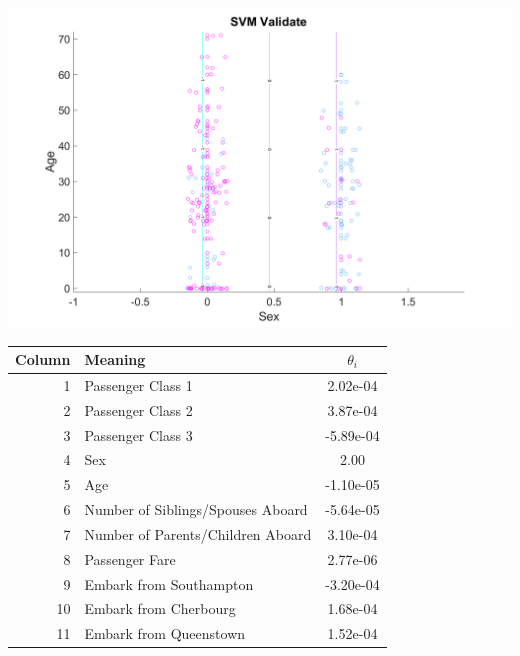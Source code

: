 \documentclass[10pt,letterpaper]{article}
\begin{document}
\begin{minipage}{\textwidth}
\begin{minipage}[b]{.4\textwidth}
\centering
\includegraphics[width=\linewidth]{figures/sex_age_validate.png}
\label{sexagelr}
\end{minipage}
\hfill
\begin{minipage}[b]{.59\textwidth}
\centering
\begin{tabular}{rlc}
Column & Meaning                           & $\theta_i$\\ \hline
1      & Passenger Class 1                 & 2.02e-04  \\
2      & Passenger Class 2                 & 3.87e-04  \\
3      & Passenger Class 3                 & -5.89e-04 \\
4      & Sex                               & 2.00      \\
5      & Age                               & -1.10e-05 \\
6      & Number of Siblings/Spouses Aboard & -5.64e-05 \\
7      & Number of Parents/Children Aboard & 3.10e-04  \\
8      & Passenger Fare                    & 2.77e-06  \\
9      & Embark from Southampton           & -3.20e-04 \\
10     & Embark from Cherbourg             & 1.68e-04  \\
11     & Embark from Queenstown            & 1.52e-04  \\
\end{tabular}

\end{minipage}

\end{minipage}
\end{document}
